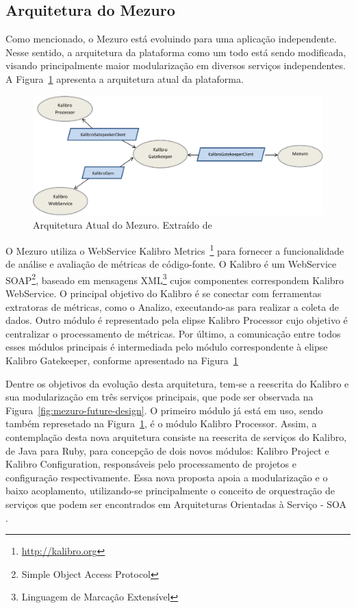 %

\subsection{Arquitetura do Mezuro}
\label{sec-mezuro-design}

Como mencionado, o Mezuro está evoluindo para uma aplicação independente. Nesse sentido, a arquitetura da plataforma como um todo está sendo modificada, visando principalmente maior modularização em diversos serviços independentes. A Figura~\ref{fig:mezuro-current-design} apresenta a arquitetura atual da plataforma.

\graphicspath{{figuras/}}
\begin{figure}[h]
\centering
\includegraphics[width=1.0\textwidth]{MezuroAtual.eps}
\caption{Arquitetura Atual do Mezuro. Extraído de \cite{manzo2014}}
\label{fig:mezuro-current-design}
\end{figure}


O Mezuro utiliza o WebService Kalibro Metrics~\footnote{\url{http://kalibro.org}} para fornecer a funcionalidade de análise e avaliação de métricas de código-fonte.
%
O Kalibro é um WebService SOAP\footnote{Simple Object Access Protocol}, baseado em mensagens XML\footnote{Linguagem de Marcação Extensível} cujos componentes correspondem Kalibro WebService.
%
O principal objetivo do Kalibro é se conectar com ferramentas extratoras de métricas, como o Analizo, executando-as para realizar a coleta de dados.
%
Outro módulo é representado pela elipse Kalibro Processor cujo objetivo é centralizar o processamento de métricas.
%
Por último, a comunicação entre todos esses módulos principais é intermediada pelo módulo correspondente à elipse Kalibro Gatekeeper, conforme apresentado
na Figura~\ref{fig:mezuro-current-design}

%

Dentre os objetivos da evolução desta arquitetura, tem-se a reescrita do Kalibro e sua modularização em três serviços principais, que pode ser observada na Figura~\ref{fig:mezuro-future-design}.
%
O primeiro módulo já está em uso, sendo também represetado na Figura~\ref{fig:mezuro-current-design}, é o módulo Kalibro Processor.
%
Assim, a contemplação desta nova arquitetura consiste na reescrita de serviços do Kalibro, de Java para Ruby, para concepção de dois novos módulos: Kalibro Project e Kalibro Configuration, responsáveis pelo processamento de projetos e configuração respectivamente.
%
Essa nova proposta apoia a modularização e o baixo acoplamento, utilizando-se principalmente o conceito de orquestração de serviços que podem ser encontrados em Arquiteturas Orientadas à Serviço - SOA \cite{thomaserl2007}.

